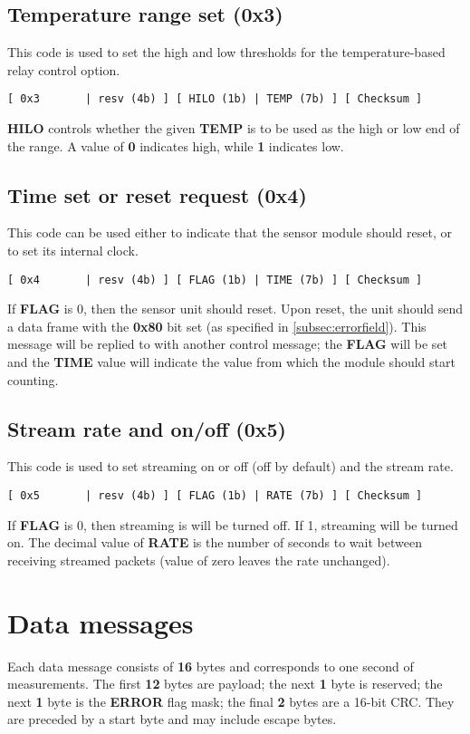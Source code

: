 \documentclass[11pt]{article}
\begin{document}
\subsection{Temperature range set (0x3)}
This code is used to set the high and low thresholds for the temperature-based relay control option.
\begin{verbatim}
[ 0x3       | resv (4b) ] [ HILO (1b) | TEMP (7b) ] [ Checksum ]
\end{verbatim}
\textbf{HILO} controls whether the given \textbf{TEMP} is to be used as the high or low end of the range. A value of \textbf{0} indicates high, while \textbf{1} indicates low.

\subsection{Time set or reset request (0x4)}
This code can be used either to indicate that the sensor module should reset, or to set its internal clock.
\begin{verbatim}
[ 0x4       | resv (4b) ] [ FLAG (1b) | TIME (7b) ] [ Checksum ]
\end{verbatim}
If \textbf{FLAG} is 0, then the sensor unit should reset. Upon reset, the unit should send a data frame with the \textbf{0x80} bit set (as specified in \ref{subsec:errorfield}). This message will be replied to with another control message; the \textbf{FLAG} will be set and the \textbf{TIME} value will indicate the value from which the module should start counting.

\subsection{Stream rate and on/off (0x5)}
This code is used to set streaming on or off (off by default) and the stream rate.
\begin{verbatim}
[ 0x5       | resv (4b) ] [ FLAG (1b) | RATE (7b) ] [ Checksum ]
\end{verbatim}
If \textbf{FLAG} is 0, then streaming is will be turned off. If 1, streaming will be turned on. The decimal value of \textbf{RATE} is the number of seconds to wait between receiving streamed packets (value of zero leaves the rate unchanged).

\section{Data messages}
Each data message consists of \textbf{16} bytes and corresponds to one second of measurements. The first \textbf{12} bytes are payload; the next \textbf{1} byte is reserved; the next \textbf{1} byte is the \textbf{ERROR} flag mask; the final \textbf{2} bytes are a 16-bit CRC. They are preceded by a start byte and may include escape bytes.
\end{document}
